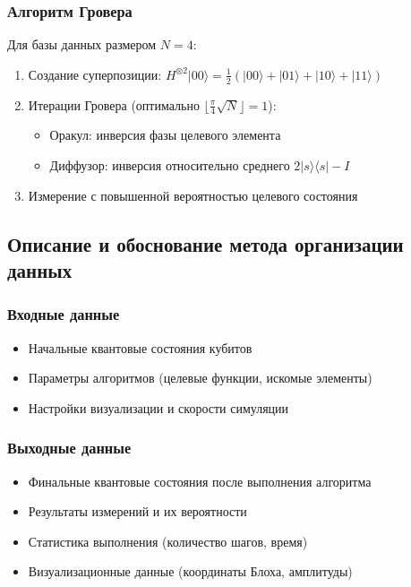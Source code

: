 \documentclass[14pt,russian]{extarticle}
\begin{document}
\subsubsection{Алгоритм Гровера}

Для базы данных размером $N = 4$:
\begin{enumerate}
    \item Создание суперпозиции: $H^{\otimes 2}|00\rangle = \frac{1}{2}(|00\rangle + |01\rangle + |10\rangle + |11\rangle)$
    \item Итерации Гровера (оптимально $\lfloor\frac{\pi}{4}\sqrt{N}\rfloor = 1$):
    \begin{itemize}
        \item Оракул: инверсия фазы целевого элемента
        \item Диффузор: инверсия относительно среднего $2|s\rangle\langle s| - I$
    \end{itemize}
    \item Измерение с повышенной вероятностью целевого состояния
\end{enumerate}

\subsection{Описание и обоснование метода организации данных}

\subsubsection{Входные данные}

\begin{itemize}
    \item Начальные квантовые состояния кубитов
    \item Параметры алгоритмов (целевые функции, искомые элементы)
    \item Настройки визуализации и скорости симуляции
\end{itemize}

\subsubsection{Выходные данные}

\begin{itemize}
    \item Финальные квантовые состояния после выполнения алгоритма
    \item Результаты измерений и их вероятности
    \item Статистика выполнения (количество шагов, время)
    \item Визуализационные данные (координаты Блоха, амплитуды)
\end{itemize}
\end{document}
